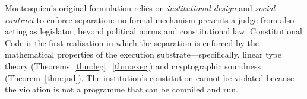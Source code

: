 \begin{remark}
Montesquieu's original formulation relies on \emph{institutional
design} and \emph{social contract} to enforce separation: no formal
mechanism prevents a judge from also acting as legislator, beyond
political norms and constitutional law. Constitutional Code is the
first realisation in which the separation is enforced by the
mathematical properties of the execution substrate---specifically,
linear type theory (Theorems~\ref{thm:leg},~\ref{thm:exec}) and
cryptographic soundness (Theorem~\ref{thm:jud}). The institution's
constitution cannot be violated because the violation is not a
programme that can be compiled and run.
\end{remark}
